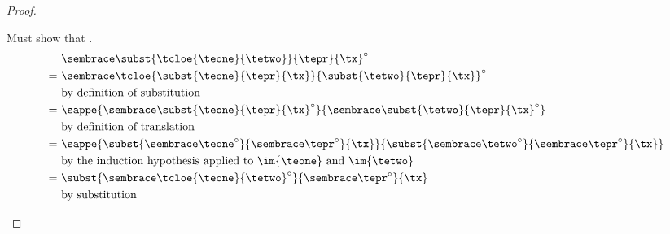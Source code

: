 \begin{proof}
\begin{proofcases}
    Must show that \im{\absccmodel{\subst{\tcloe{\teone}{\tetwo}}{\tepr}{\tx}} =
      \subst{\absccmodel{\tcloe{\teone}{\tetwo}}}{\absccmodel{\tepr}}{\tx}}.
    \begin{align}
      & \absccmodel{\subst{\tcloe{\teone}{\tetwo}}{\tepr}{\tx}} \nonumber \\
      =~&  \absccmodel{\tcloe{\subst{\teone}{\tepr}{\tx}}{\subst{\tetwo}{\tepr}{\tx}}} \\
      & \text{by definition of substitution} \nonumber \\
      =~&  \sappe{\absccmodel{\subst{\teone}{\tepr}{\tx}}}{\absccmodel{\subst{\tetwo}{\tepr}{\tx}}} \\
      & \text{by definition of translation} \nonumber \\
      =~&
      \sappe{\subst{\absccmodel{\teone}}{\absccmodel{\tepr}}{\tx}}{\subst{\absccmodel{\tetwo}}{\absccmodel{\tepr}}{\tx}} \\
      & \text{by the induction hypothesis applied to \im{\teone} and \im{\tetwo}} \nonumber \\
      =~&
      \subst{\absccmodel{\tcloe{\teone}{\tetwo}}}{\absccmodel{\tepr}}{\tx} \\
      & \text{by substitution} \nonumber
    \end{align}
  \end{proofcases}
\end{proof}

